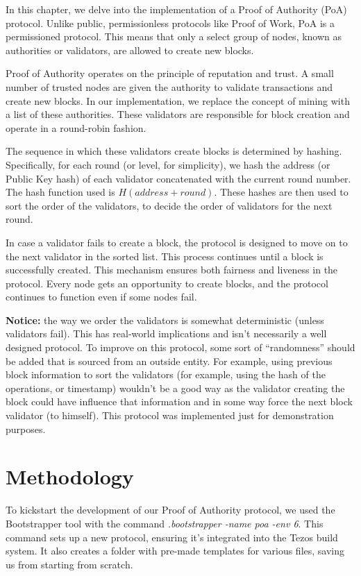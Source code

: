 In this chapter, we delve into the implementation of a Proof of Authority (PoA) protocol. Unlike public, permissionless protocols like Proof of Work, PoA is a permissioned protocol. This means that only a select group of nodes, known as authorities or validators, are allowed to create new blocks.

Proof of Authority operates on the principle of reputation and trust. A small number of trusted nodes are given the authority to validate transactions and create new blocks. In our implementation, we replace the concept of mining with a list of these authorities. These validators are responsible for block creation and operate in a round-robin fashion.

The sequence in which these validators create blocks is determined by hashing. Specifically, for each round (or level, for simplicity), we hash the address (or Public Key hash) of each validator concatenated with the current round number. The hash function used is $H(address + round)$. These hashes are then used to sort the order of the validators, to decide the order of validators for the next round.


In case a validator fails to create a block, the protocol is designed to move on to the next validator in the sorted list. This process continues until a block is successfully created. This mechanism ensures both fairness and liveness in the protocol. Every node gets an opportunity to create blocks, and the protocol continues to function even if some nodes fail.

\textbf{Notice:} the way we order the validators is somewhat deterministic (unless validators fail). This has real-world implications and isn't necessarily a well designed protocol. 
To improve on this protocol, some sort of ``randomness'' should be added that is sourced from an outside entity. For example, using previous block information to sort the validators (for example, using the hash of the operations, or timestamp) wouldn't be a good way as the validator creating the block could have influence that information and in some way force the next block validator (to himself). This protocol was implemented just for demonstration purposes.

\section{Methodology}

To kickstart the development of our Proof of Authority protocol, we used the Bootstrapper tool with the command \textit{.\/bootstrapper -name poa -env 6}. This command sets up a new protocol, ensuring it's integrated into the Tezos build system. It also creates a folder with pre-made templates for various files, saving us from starting from scratch.

